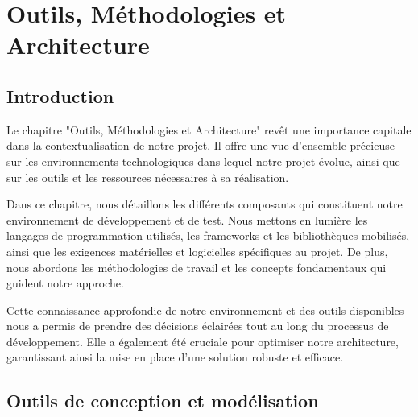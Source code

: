 \chapter{Outils, Méthodologies et Architecture}
\label{chap:Chapter 3 title}
\section*{Introduction}

\hspace{\parindent}Le chapitre "Outils, Méthodologies et Architecture" revêt une importance capitale dans la contextualisation de notre projet. Il offre une vue d'ensemble précieuse sur les environnements technologiques dans lequel notre projet évolue, ainsi que sur les outils et les ressources nécessaires à sa réalisation.

Dans ce chapitre, nous détaillons les différents composants qui constituent notre environnement de développement et de test. Nous mettons en lumière les langages de programmation utilisés, les frameworks et les bibliothèques mobilisés, ainsi que les exigences matérielles et logicielles spécifiques au projet. De plus, nous abordons les méthodologies de travail et les concepts fondamentaux qui guident notre approche.

Cette connaissance approfondie de notre environnement et des outils disponibles nous a permis de prendre des décisions éclairées tout au long du processus de développement. Elle a également été cruciale pour optimiser notre architecture, garantissant ainsi la mise en place d'une solution robuste et efficace.

\newpage





\section{Outils de conception et modélisation}


